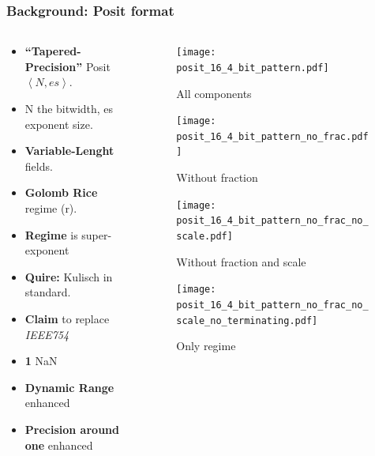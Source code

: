\begin{frame}
    \frametitle{Background: Posit format}
    \begin{columns}
        \begin{column}{0.45\textwidth}
            \begin{itemize}
		\item<1-> \textbf{``Tapered-Precision''} Posit$\left \langle N,es \right \rangle$.
		\item<1-> N the bitwidth, es exponent size.
		\item<2-> \textbf{Variable-Lenght} fields.
		\item<2-> \textbf{Golomb Rice} regime (r).
		\item<2-> \textbf{Regime} is super-exponent
		\item<3-> \textbf{Quire:} Kulisch in standard.
		\item<3-> \textbf{Claim} to replace \textit{IEEE754}
		\item<3-> \textbf{1} NaN
		\item<3-> \textbf{Dynamic Range} enhanced
		\item<3-> \textbf{Precision around one} enhanced
            \end{itemize}
        \end{column}
        \begin{column}{0.55\textwidth}
		\begin{figure}[H]
            \centering
			\vspace{5pt}
            \texttt{[image: posit\_16\_4\_bit\_pattern.pdf]}
			\vspace{-10pt}
            \caption{All components}

            \texttt{[image: posit\_16\_4\_bit\_pattern\_no\_frac.pdf]}
			\vspace{-10pt}
            \caption{Without fraction}

            \texttt{[image: posit\_16\_4\_bit\_pattern\_no\_frac\_no\_scale.pdf]}
			\vspace{-10pt}
            \caption{Without fraction and scale}

            \texttt{[image: posit\_16\_4\_bit\_pattern\_no\_frac\_no\_scale\_no\_terminating.pdf]}
			\vspace{-10pt}
            \caption{Only regime}
	\end{figure}
        \end{column}
    \end{columns}
\end{frame}


